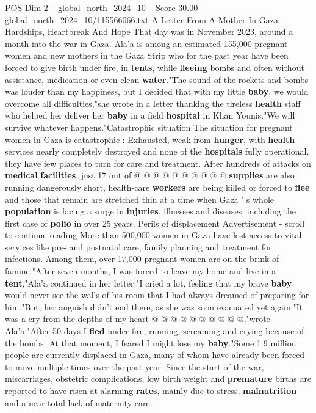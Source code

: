 \begin{textsample}{POS Dim 2 – global\_north\_2024\_10 – Score 30.00 – global\_north\_2024\_10/115566066.txt}  \label{ex:f2_pos_345}
A Letter From A Mother In Gaza : Hardships, Heartbreak And Hope That day was in November 2023, around a month into the war in Gaza.
Ala'a is among an estimated 155,000 pregnant women and new mothers in the Gaza Strip who for the past year have been forced to give birth under fire, in \textbf{tents}, while \textbf{fleeing} bombs and often without assistance, medication or even clean \textbf{water}."The sound of the rockets and bombs was louder than my happiness, but I decided that with my little \textbf{baby}, we would overcome all difficulties,"she wrote in a letter thanking the tireless \textbf{health} staff who helped her deliver her \textbf{baby} in a field \textbf{hospital} in Khan Younis."We will survive whatever happens."Catastrophic situation The situation for pregnant women in Gaza is catastrophic : Exhausted, weak from \textbf{hunger}, with \textbf{health} services nearly completely destroyed and none of the \textbf{hospitals} fully operational, they have few places to turn for care and treatment.
After hundreds of attacks on \textbf{medical} \textbf{facilities}, just 17 out of @ @ @ @ @ @ @ @ @ @ \textbf{supplies} are also running dangerously short, health-care \textbf{workers} are being killed or forced to \textbf{flee} and those that remain are stretched thin at a time when Gaza ' s whole \textbf{population} is facing a surge in \textbf{injuries}, illnesses and diseases, including the first case of \textbf{polio} in over 25 years.
Perils of displacement Advertisement - scroll to continue reading More than 500,000 women in Gaza have lost access to vital services like pre- and postnatal care, family planning and treatment for infections.
Among them, over 17,000 pregnant women are on the brink of famine."After seven months, I was forced to leave my home and live in a \textbf{tent},"Ala'a continued in her letter."I cried a lot, feeling that my brave \textbf{baby} would never see the walls of his room that I had always dreamed of preparing for him."But, her anguish didn't end there, as she was soon evacuated yet again."It was a cry from the depths of my heart @ @ @ @ @ @ @ @ @ @,"wrote Ala'a."After 50 days I \textbf{fled} under fire, running, screaming and crying because of the bombs.
At that moment, I feared I might lose my \textbf{baby}."Some 1.9 million people are currently displaced in Gaza, many of whom have already been forced to move multiple times over the past year.
Since the start of the war, miscarriages, obstetric complications, low birth weight and \textbf{premature} births are reported to have risen at alarming \textbf{rates}, mainly due to stress, \textbf{malnutrition} and a near-total lack of maternity care.

\end{textsample}
